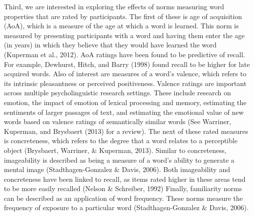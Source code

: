 \documentclass[english,man]{apa6}
\theoremstyle{definition}
\theoremstyle{definition}
\theoremstyle{remark}
\begin{document}
Third, we are interested in exploring the effects of norms measuring
word properties that are rated by participants. The first of these is
age of acquisition (AoA), which is a measure of the age at which a word
is learned. This norm is measured by presenting participants with a word
and having them enter the age (in years) in which they believe that they
would have learned the word (Kuperman et al., 2012). AoA ratings have
been found to be predictive of recall. For example, Dewhurst, Hitch, and
Barry (1998) found recall to be higher for late acquired words. Also of
interest are measures of a word's valence, which refers to its intrinsic
pleasantness or perceived positiveness. Valence ratings are important
across multiple psycholinguistic research settings. These include
research on emotion, the impact of emotion of lexical processing and
memory, estimating the sentiments of larger passages of text, and
estimating the emotional value of new words based on valence ratings of
semantically similar words (See Warriner, Kuperman, and Brysbaert (2013)
for a review). The next of these rated measures is concreteness, which
refers to the degree that a word relates to a perceptible object
(Brysbaert, Warriner, \& Kuperman, 2013). Similar to concreteness,
imageability is described as being a measure of a word's ability to
generate a mental image (Stadthagen-Gonzalez \& Davis, 2006). Both
imageability and concreteness have been linked to recall, as items rated
higher in these areas tend to be more easily recalled (Nelson \&
Schreiber, 1992) Finally, familiarity norms can be described as an
application of word frequency. These norms measure the frequency of
exposure to a particular word (Stadthagen-Gonzalez \& Davis, 2006).
\end{document}
